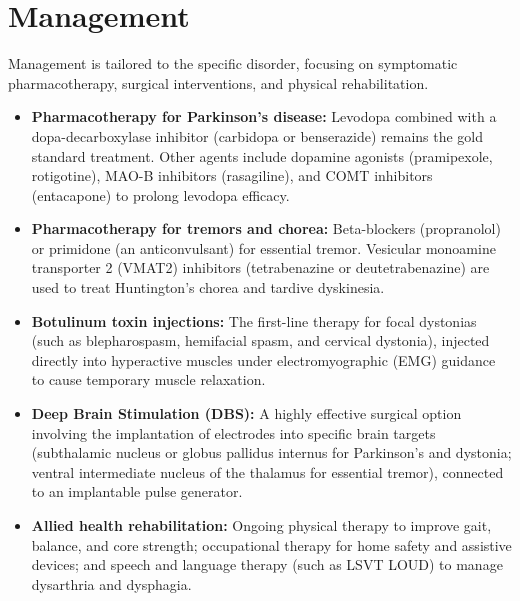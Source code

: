 \section*{Management}
Management is tailored to the specific disorder, focusing on symptomatic pharmacotherapy, surgical interventions, and physical rehabilitation.
\begin{itemize}
    \item \textbf{Pharmacotherapy for Parkinson's disease:} Levodopa combined with a dopa-decarboxylase inhibitor (carbidopa or benserazide) remains the gold standard treatment. Other agents include dopamine agonists (pramipexole, rotigotine), MAO-B inhibitors (rasagiline), and COMT inhibitors (entacapone) to prolong levodopa efficacy.
    \item \textbf{Pharmacotherapy for tremors and chorea:} Beta-blockers (propranolol) or primidone (an anticonvulsant) for essential tremor. Vesicular monoamine transporter 2 (VMAT2) inhibitors (tetrabenazine or deutetrabenazine) are used to treat Huntington's chorea and tardive dyskinesia.
    \item \textbf{Botulinum toxin injections:} The first-line therapy for focal dystonias (such as blepharospasm, hemifacial spasm, and cervical dystonia), injected directly into hyperactive muscles under electromyographic (EMG) guidance to cause temporary muscle relaxation.
    \item \textbf{Deep Brain Stimulation (DBS):} A highly effective surgical option involving the implantation of electrodes into specific brain targets (subthalamic nucleus or globus pallidus internus for Parkinson's and dystonia; ventral intermediate nucleus of the thalamus for essential tremor), connected to an implantable pulse generator.
    \item \textbf{Allied health rehabilitation:} Ongoing physical therapy to improve gait, balance, and core strength; occupational therapy for home safety and assistive devices; and speech and language therapy (such as LSVT LOUD) to manage dysarthria and dysphagia.
\end{itemize}

